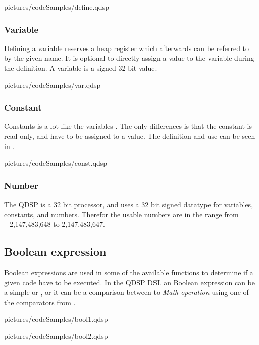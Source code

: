
  {pictures/codeSamples/define.qdsp}
	
\subsubsection{Variable}\label{programmingLanguage_Variable}
Defining a variable reserves a heap register which afterwards can be referred to by the given name. It is optional to directly assign a value to the variable during the definition. A variable is a signed 32 bit value.


  {pictures/codeSamples/var.qdsp}

\subsubsection{Constant}
Constants is a lot like the variables . The only differences is that the constant is read only, and have to be assigned to a value. The definition and use can be seen in .


  {pictures/codeSamples/const.qdsp}
	
\subsubsection{Number}
The QDSP is a 32 bit processor, and uses a 32 bit signed datatype for variables, constants, and numbers. Therefor the usable numbers are in the range from −2,147,483,648 to 2,147,483,647.

\subsection{Boolean expression} 
Boolean expressions are used in some of the available functions to determine if a given code have to be executed. In the QDSP DSL an Boolean expression can be a simple  or , or it can be a comparison between to \textit{Math operation} using one of the comparators from .


  {pictures/codeSamples/bool1.qdsp}
	
	
  {pictures/codeSamples/bool2.qdsp}
	
